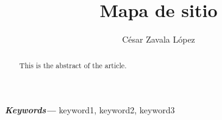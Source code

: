 \documentclass{article}
\date{}
\title{Mapa de sitio}
\author[1,*]{César Zavala López \orcidlink{0000-1111-1111-2222}}
\affil[1]{Universidad Politécnica de victoria}
\providecommand{\keywords}[1]
{
  \small  
  \textbf{\textit{Keywords---}} #1
}
\begin{document}
\maketitle
\begin{abstract}
This is the abstract of the article.
\end{abstract}
\keywords{keyword1, keyword2, keyword3}
\end{document}
